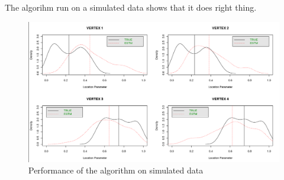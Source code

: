 \documentclass[12pt]{article}%
\begin{document}
The algorihm run on a simulated data shows that it does right thing.  
\begin{figure}
\begin{center}
\includegraphics[scale=0.30]{comparing_density.png}
\end{center}
\caption{Performance of the algorithm on simulated data}
\end{figure}
\end{document}
